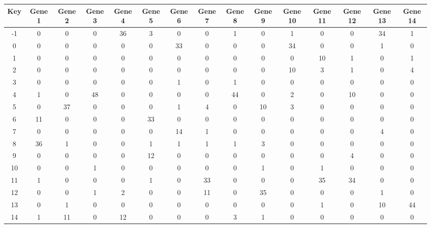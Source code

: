 \begin{tabular}{|c|c|c|c|c|c|c|c|c|c|c|c|c|c|c|}
\hline
Key & Gene 1 & Gene 2 & Gene 3 & Gene 4 & Gene 5 & Gene 6 & Gene 7 & Gene 8 & Gene 9 & Gene 10 & Gene 11 & Gene 12 & Gene 13 & Gene 14 \\
\hline
-1 & 0 & 0 & 0 & 36 & 3 & 0 & 0 & 1 & 0 & 1 & 0 & 0 & 34 & 1 \\
0 & 0 & 0 & 0 & 0 & 0 & 33 & 0 & 0 & 0 & 34 & 0 & 0 & 1 & 0 \\
1 & 0 & 0 & 0 & 0 & 0 & 0 & 0 & 0 & 0 & 0 & 10 & 1 & 0 & 1 \\
2 & 0 & 0 & 0 & 0 & 0 & 0 & 0 & 0 & 0 & 10 & 3 & 1 & 0 & 4 \\
3 & 0 & 0 & 0 & 0 & 0 & 1 & 0 & 1 & 0 & 0 & 0 & 0 & 0 & 0 \\
4 & 1 & 0 & 48 & 0 & 0 & 0 & 0 & 44 & 0 & 2 & 0 & 10 & 0 & 0 \\
5 & 0 & 37 & 0 & 0 & 0 & 1 & 4 & 0 & 10 & 3 & 0 & 0 & 0 & 0 \\
6 & 11 & 0 & 0 & 0 & 33 & 0 & 0 & 0 & 0 & 0 & 0 & 0 & 0 & 0 \\
7 & 0 & 0 & 0 & 0 & 0 & 14 & 1 & 0 & 0 & 0 & 0 & 0 & 4 & 0 \\
8 & 36 & 1 & 0 & 0 & 1 & 1 & 1 & 1 & 3 & 0 & 0 & 0 & 0 & 0 \\
9 & 0 & 0 & 0 & 0 & 12 & 0 & 0 & 0 & 0 & 0 & 0 & 4 & 0 & 0 \\
10 & 0 & 0 & 1 & 0 & 0 & 0 & 0 & 0 & 1 & 0 & 1 & 0 & 0 & 0 \\
11 & 1 & 0 & 0 & 0 & 1 & 0 & 33 & 0 & 0 & 0 & 35 & 34 & 0 & 0 \\
12 & 0 & 0 & 1 & 2 & 0 & 0 & 11 & 0 & 35 & 0 & 0 & 0 & 1 & 0 \\
13 & 0 & 1 & 0 & 0 & 0 & 0 & 0 & 0 & 0 & 0 & 1 & 0 & 10 & 44 \\
14 & 1 & 11 & 0 & 12 & 0 & 0 & 0 & 3 & 1 & 0 & 0 & 0 & 0 & 0 \\
\hline
\end{tabular}